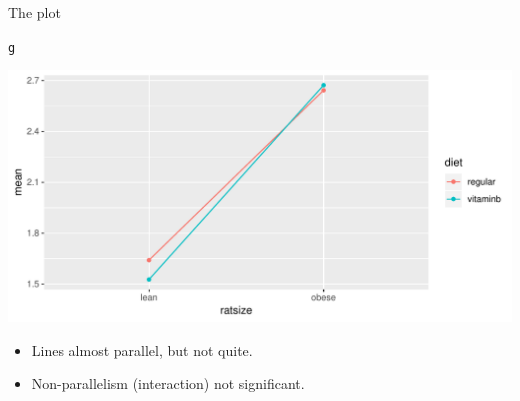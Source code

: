 \documentclass[unknownkeysallowed]{beamer}\usepackage[]{graphicx}\usepackage[]{color}
\makeatletter
\def\maxwidth{ %
  \ifdim\Gin@nat@width>\linewidth
    \linewidth
  \else
    \Gin@nat@width
  \fi
}
\newcommand{\hlstd}[1]{\textcolor[rgb]{0.345,0.345,0.345}{#1}}%
\newenvironment{kframe}{%
 \def\at@end@of@kframe{}%
 \ifinner\ifhmode%
  \def\at@end@of@kframe{\end{minipage}}%
  \begin{minipage}{\columnwidth}%
 \fi\fi%
 \def\FrameCommand##1{\hskip\@totalleftmargin \hskip-\fboxsep
 \colorbox{shadecolor}{##1}\hskip-\fboxsep
     \hskip-\linewidth \hskip-\@totalleftmargin \hskip\columnwidth}%
 \MakeFramed {\advance\hsize-\width
   \@totalleftmargin\z@ \linewidth\hsize
   \@setminipage}}%
 {\par\unskip\endMakeFramed%
 \at@end@of@kframe}
\newenvironment{knitrout}{}{} %
\makeatother
\begin{document}
\begin{frame}[fragile]{The plot}
 
  
\begin{knitrout}
\color{fgcolor}\begin{kframe}
\begin{alltt}
\hlstd{g}
\end{alltt}
\end{kframe}
\includegraphics[width=\maxwidth]{figure/nachwazzo-1} 

\end{knitrout}
   
   
 
 \begin{itemize}
 \item Lines almost parallel, but not quite.
 \item Non-parallelism (interaction) not significant.
 \end{itemize}
   
\end{frame}
 
\end{document}
